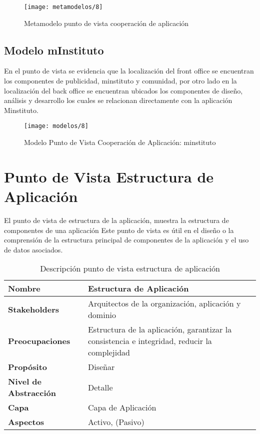 \begin{figure}[H]
	\centering
	\texttt{[image: metamodelos/8]}
	\captionsetup{width=.95\textwidth}
	\caption{Metamodelo punto de vista cooperación de aplicación}
	\label{metamodelo8}
\end{figure}

\subsection{Modelo mInstituto}
En el punto de vista se evidencia que la localización del front office se encuentran los componentes de publicidad, minstituto y comunidad, por otro lado en la localización del back office se encuentran ubicados los componentes de diseño, análisis y desarrollo los cuales se relacionan directamente con la aplicación Minstituto.

\begin{figure}[H]
	\centering
	\texttt{[image: modelos/8]}
	\captionsetup{width=.95\textwidth}
	\caption{Modelo Punto de Vista Cooperación de Aplicación: minstituto}
	\label{modelo8}
\end{figure}

\section{Punto de Vista Estructura de Aplicación}
El punto de vista de estructura de la aplicación, muestra la estructura de componentes de una aplicación Este punto de vista es útil en el diseño o la comprensión de la estructura principal de componentes de la aplicación y el uso de datos asociados.

  \begin{table}[H]
  	\centering
  	\begin{tabular}{p{3.7cm}p{8cm}}
  		\hline
  		\rowcolor[HTML]{0073a1}
  		{\color[HTML]{FFFFFF} \textbf{Nombre}} & {\color[HTML]{FFFFFF} \textbf{Estructura de Aplicación}} \\
  		\hline
  		\textbf{Stakeholders} & Arquitectos de la organización, aplicación y dominio \\
  		\textbf{Preocupaciones} & Estructura de la aplicación, garantizar la consistencia e integridad, reducir la complejidad \\
  		\textbf{Propósito} & Diseñar \\
  		\textbf{Nivel de Abstracción} & Detalle \\
  		\textbf{Capa} & Capa de Aplicación \\
  		\textbf{Aspectos} & Activo, (Pasivo) \\
  		\bottomrule
  	\end{tabular}
  	\captionsetup{width=.95\textwidth}
  	\caption{Descripción punto de vista estructura de aplicación}
  	\label{tabla12}
  \end{table}


